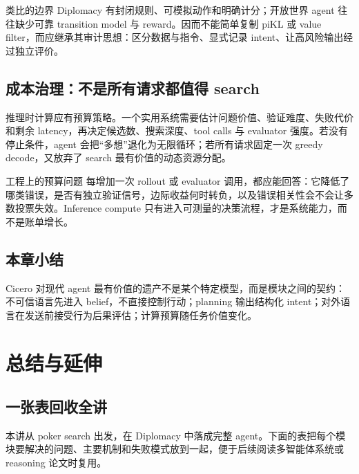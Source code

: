 \documentclass[a4paper]{article}
\begin{document}
\begin{warningbox}{类比的边界}
Diplomacy 有封闭规则、可模拟动作和明确计分；开放世界 agent 往往缺少可靠 transition model 与 reward。因而不能简单复制 piKL 或 value filter，而应继承其审计思想：区分数据与指令、显式记录 intent、让高风险输出经过独立评价。
\end{warningbox}

\subsection{成本治理：不是所有请求都值得 search}

推理时计算应有预算策略。一个实用系统需要估计问题价值、验证难度、失败代价和剩余 latency，再决定候选数、搜索深度、tool calls 与 evaluator 强度。若没有停止条件，agent 会把“多想”退化为无限循环；若所有请求固定一次 greedy decode，又放弃了 search 最有价值的动态资源分配。

\begin{importantbox}{工程上的预算问题}
每增加一次 rollout 或 evaluator 调用，都应能回答：它降低了哪类错误，是否有独立验证信号，边际收益何时转负，以及错误相关性会不会让多数投票失效。Inference compute 只有进入可测量的决策流程，才是系统能力，而不是账单增长。
\end{importantbox}

\subsection{本章小结}

Cicero 对现代 agent 最有价值的遗产不是某个特定模型，而是模块之间的契约：不可信语言先进入 belief，不直接控制行动；planning 输出结构化 intent；对外语言在发送前接受行为后果评估；计算预算随任务价值变化。

\section{总结与延伸}

\subsection{一张表回收全讲}

本讲从 poker search 出发，在 Diplomacy 中落成完整 agent。下面的表把每个模块要解决的问题、主要机制和失败模式放到一起，便于后续阅读多智能体系统或 reasoning 论文时复用。
\end{document}
